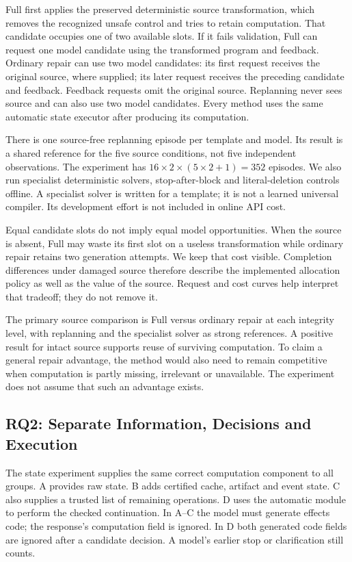 \documentclass[conference]{IEEEtran}
\begin{document}
Full first applies the preserved deterministic source transformation, which removes the recognized unsafe control and tries to retain computation. That candidate occupies one of two available slots. If it fails validation, Full can request one model candidate using the transformed program and feedback. Ordinary repair can use two model candidates: its first request receives the original source, where supplied; its later request receives the preceding candidate and feedback. Feedback requests omit the original source. Replanning never sees source and can also use two model candidates. Every method uses the same automatic state executor after producing its computation.

There is one source-free replanning episode per template and model. Its result is a shared reference for the five source conditions, not five independent observations. The experiment has $16\times2\times(5\times2+1)=352$ episodes. We also run specialist deterministic solvers, stop-after-block and literal-deletion controls offline. A specialist solver is written for a template; it is not a learned universal compiler. Its development effort is not included in online API cost.

Equal candidate slots do not imply equal model opportunities. When the source is absent, Full may waste its first slot on a useless transformation while ordinary repair retains two generation attempts. We keep that cost visible. Completion differences under damaged source therefore describe the implemented allocation policy as well as the value of the source. Request and cost curves help interpret that tradeoff; they do not remove it.

The primary source comparison is Full versus ordinary repair at each integrity level, with replanning and the specialist solver as strong references. A positive result for intact source supports reuse of surviving computation. To claim a general repair advantage, the method would also need to remain competitive when computation is partly missing, irrelevant or unavailable. The experiment does not assume that such an advantage exists.

\subsection{RQ2: Separate Information, Decisions and Execution}
The state experiment supplies the same correct computation component to all groups. A provides raw state. B adds certified cache, artifact and event state. C also supplies a trusted list of remaining operations. D uses the automatic module to perform the checked continuation. In A--C the model must generate effects code; the response's computation field is ignored. In D both generated code fields are ignored after a candidate decision. A model's earlier stop or clarification still counts.
\end{document}
